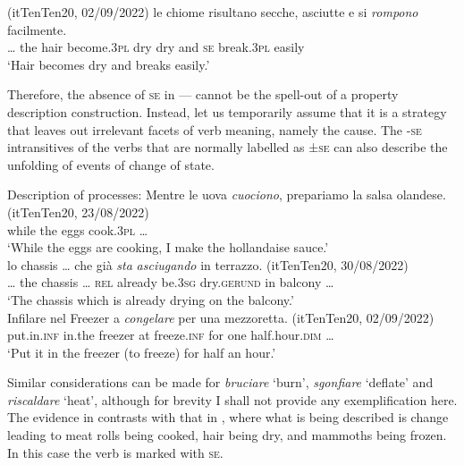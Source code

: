 \documentclass[output=paper,colorlinks,citecolor=brown
]{langscibook}
\begin{document}
\hspace*{\fill}(itTenTen20, 02/09/2022)\quad
\ea \label{bentley_example_23}
    \gll  {\ldots}  le		chiome risultano				secche,	asciutte e				si 		\textit{rompono} facilmente.\\
    {\ldots} the	hair				become.3\textsc{pl}	dry					dry					and	\textsc{se}		break.3\textsc{pl}	easily \\
    \glt ‘Hair becomes dry and breaks easily.’ 
\z

Therefore, the absence of \textsc{se} in — cannot be the spell-out of a property description construction. Instead, let us temporarily assume that it is a strategy that leaves out irrelevant facets of verb meaning, namely the cause. 
The -\textsc{se} intransitives of the verbs that are normally labelled as ±\textsc{se} can also describe the unfolding of events of change of state. 

\ea \label{bentley_example_24}
    Description of processes:
    \ea \label{bentley_example_24a}
    \gll Mentre	le			uova	\textit{cuociono}, { prepariamo la salsa olandese. (itTenTen20, 23/08/2022)} \\
    while			the		eggs		cook.3\textsc{pl} {\ldots} \\
    \glt ‘While the eggs are cooking, I make the hollandaise sauce.’ \\
    \ex \label{bentley_example_24b}
    \gll  {\ldots}  lo chassis  {\ldots}  che		già 				\textit{sta} 			\textit{asciugando}	in 	terrazzo. {(itTenTen20, 30/08/2022)}\\
    {\ldots} the	chassis	 {\ldots}				\textsc{rel}	already	be.3\textsc{sg}	dry.\textsc{gerund}	in		balcony	{\ldots} \\
    \glt 	‘The chassis which is already drying on the balcony.’ \\
    \ex \label{bentley_example_24c}
    \gll Infilare			nel			Freezer	a		\textit{congelare}		per 	una	mezzoretta. {(itTenTen20, 02/09/2022)}\\
    put.in.\textsc{inf}		in.the	freezer		at	freeze.\textsc{inf}	for		one	half.hour.\textsc{dim}	{\ldots} \\
    \glt 					‘Put it in the freezer (to freeze) for half an hour.’ \\
    \z
\z

Similar considerations can be made for \textit{bruciare} ‘burn’, \textit{sgonfiare} ‘deflate’ and \textit{riscaldare} ‘heat’, although for brevity I shall not provide any exemplification here. 
The evidence in  contrasts with that in , where what is being described is change leading to meat rolls being cooked, hair being dry, and mammoths being frozen. In this case the verb is marked with \textsc{se}.
\end{document}
